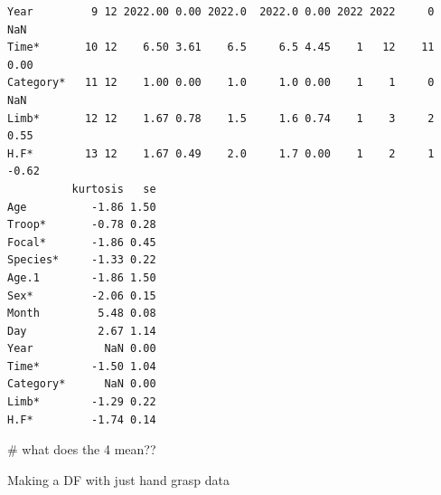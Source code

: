 \documentclass[
  letterpaper,
  DIV=11,
  numbers=noendperiod]{scrartcl}
\newenvironment{Shaded}{\begin{snugshade}}{\end{snugshade}}
\newcommand{\CommentTok}[1]{\textcolor[rgb]{0.37,0.37,0.37}{#1}}
\begin{document}
\begin{verbatim}
Year         9 12 2022.00 0.00 2022.0  2022.0 0.00 2022 2022     0   NaN
Time*       10 12    6.50 3.61    6.5     6.5 4.45    1   12    11  0.00
Category*   11 12    1.00 0.00    1.0     1.0 0.00    1    1     0   NaN
Limb*       12 12    1.67 0.78    1.5     1.6 0.74    1    3     2  0.55
H.F*        13 12    1.67 0.49    2.0     1.7 0.00    1    2     1 -0.62
          kurtosis   se
Age          -1.86 1.50
Troop*       -0.78 0.28
Focal*       -1.86 0.45
Species*     -1.33 0.22
Age.1        -1.86 1.50
Sex*         -2.06 0.15
Month         5.48 0.08
Day           2.67 1.14
Year           NaN 0.00
Time*        -1.50 1.04
Category*      NaN 0.00
Limb*        -1.29 0.22
H.F*         -1.74 0.14
\end{verbatim}

\begin{Shaded}
\begin{Highlighting}[]
\CommentTok{\# what does the 4 mean??}
\end{Highlighting}
\end{Shaded}

Making a DF with just hand grasp data
\end{document}
